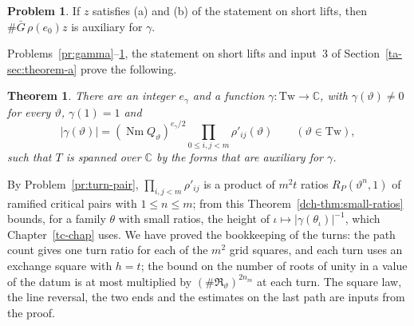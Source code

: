 \documentclass[reqno]{amsart}
\newcounter{chap}
\theoremstyle{definition}
\newtheorem{problem}{Problem}[section]
\theoremstyle{plain}
\newtheorem{theorem}{Theorem}[section]
\newcommand{\C}{\mathbb C}
\newcommand{\Nm}{\operatorname{Nm}}
\newcommand{\Tw}{\mathrm{Tw}}
\newcommand{\Gb}{\bar G}
\newcommand{\Rm}{\mathfrak R}
\begin{document}
\begin{problem}\label{pr:aux-forms}
If \(z\) satisfies (a) and (b) of the statement on short lifts, then \(\#\Gb\,\rho(e_0)z\) is auxiliary for \(\gamma\).
\end{problem}

Problems~\ref{pr:gamma}--\ref{pr:aux-forms}, the statement on short lifts and input~3 of Section~\ref{ta-sec:theorem-a} prove the following.

\begin{theorem}\label{thm:aux}
There are an integer \(e_\gamma\) and a function \(\gamma\colon\Tw\to\C\), with \(\gamma(\vartheta) \ne 0\) for every \(\vartheta\), \(\gamma(1) = 1\) and
\[
  \lvert\gamma(\vartheta)\rvert = (\Nm Q_\vartheta)^{e_\gamma/2}\prod_{0 \le i, j < m}\rho'_{ij}(\vartheta) \qquad (\vartheta \in \Tw),
\]
such that \(T\) is spanned over \(\C\) by the forms that are auxiliary for \(\gamma\).
\end{theorem}

By Problem~\ref{pr:turn-pair}, \(\prod_{i,j<m}\rho'_{ij}\) is a product of \(m^2t\) ratios \(R_P(\vartheta^n, 1)\) of ramified critical pairs with \(1 \le n \le m\); from this Theorem~\ref{dch-thm:small-ratios} bounds, for a family \(\theta\) with small ratios, the height of \(\iota \mapsto \lvert\gamma(\theta_\iota)\rvert^{-1}\), which Chapter~\ref{tc-chap} uses.  We have proved the bookkeeping of the turns: the path count gives one turn ratio for each of the \(m^2\) grid squares, and each turn uses an exchange square with \(h = t\); the bound on the number of roots of unity in a value of the datum is at most multiplied by \((\#\Rm_\vartheta)^{2n_m}\) at each turn.  The square law, the line reversal, the two ends and the estimates on the last path are inputs from the proof.
\end{document}

